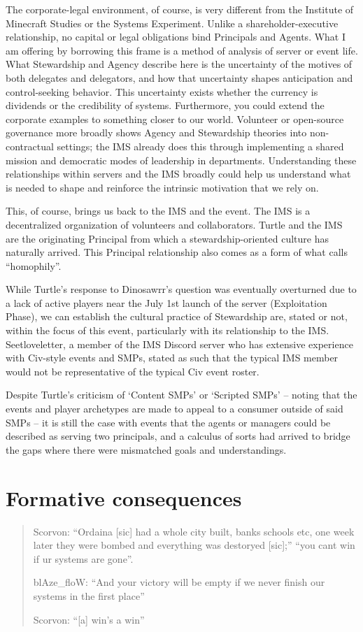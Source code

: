 The corporate-legal environment, of course, is very different from the Institute of Minecraft Studies or the Systems Experiment. Unlike a shareholder-executive relationship, no capital or legal obligations bind Principals and Agents. What I am offering by borrowing this frame is a method of analysis of server or event life. What Stewardship and Agency describe here is the uncertainty of the motives of both delegates and delegators, and how that uncertainty shapes anticipation and control-seeking behavior. This uncertainty exists whether the currency is dividends or the credibility of systems. Furthermore, you could extend the corporate examples to something closer to our world. Volunteer or open-source governance more broadly shows Agency and Stewardship theories into non-contractual settings; the IMS already does this through implementing a shared mission and democratic modes of leadership in departments. Understanding these relationships within servers and the IMS broadly could help us understand what is needed to shape and reinforce the intrinsic motivation that we rely on.

This, of course, brings us back to the IMS and the event. The IMS is a decentralized organization of volunteers and collaborators. Turtle and the IMS are the originating Principal from which a stewardship-oriented culture has naturally arrived. This Principal relationship also comes as a form of what \citet{Rev(2026)} calls “homophily”.

While Turtle's response to Dinosawrr's question was eventually overturned due to a lack of active players near the July 1st launch of the server (Exploitation Phase), we can establish the cultural practice of Stewardship are, stated or not, within the focus of this event, particularly with its relationship to the IMS. Seetloveletter, a member of the IMS Discord server who has extensive experience with Civ-style events and SMPs, stated as such that the typical IMS member would not be representative of the typical Civ event roster.~\citep{seetite(2026)}

Despite Turtle's criticism of `Content SMPs' or `Scripted SMPs' – noting that the events and player archetypes are made to appeal to a consumer outside of said SMPs – it is still the case with events that the agents or managers could be described as serving two principals, and a calculus of sorts had arrived to bridge the gaps where there were mismatched goals and understandings.~\citep{Turtle(2026),Turtle(nd)}

\section{Formative consequences}
\begin{verse}
    Scorvon: “Ordaina [sic] had a whole city built, banks schools etc, one week later they were bombed and everything was destoryed [sic];” “you cant win if ur systems are gone”.~\citep{scorevon(2026a),scorevon(2026b)}

    blAze\_floW: “And your victory will be empty if we never finish our systems in the first place”~\citep{blazeflow(2026)}

    Scorvon: “[a] win's a win”~\citep{scorevon(2026c)}
\end{verse}

